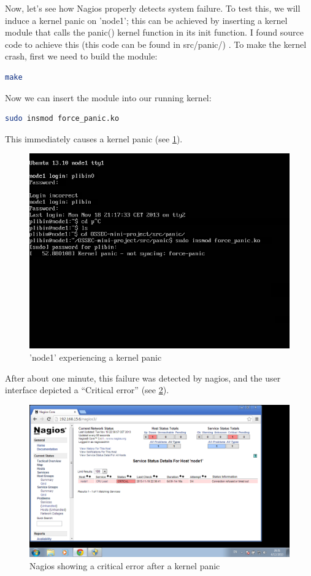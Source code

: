 \documentclass[12pt]{report}
\begin{document}
Now, let's see how Nagios properly detects system failure. To test
this, we will induce a kernel panic on 'node1'; this can be achieved
by inserting a kernel module that calls the panic() kernel function in
its init function. I found source code to achieve this (this code can
be found in src/panic/) \cite{simulate_linux_crash}.
To make the kernel crash, first we need to build the module:
\begin{lstlisting}[language=bash]
 make
\end{lstlisting} 
Now we can insert the module into our running kernel:
\begin{lstlisting}[language=bash]
 sudo insmod force_panic.ko
\end{lstlisting} 
This immediately causes a kernel panic (see \cref{fig:kernel_panic}).
\begin{figure}[h!]
  \caption{'node1' experiencing a kernel panic}
  \label{fig:kernel_panic}
  \centering
    \includegraphics[scale=0.4]{pics/kernel_panic.png}
\end{figure}
After about one minute, this failure was detected by nagios, and the
user interface depicted a ``Critical error'' (see \cref{fig:nagios_after_kernel_panic}).

\begin{figure}[h!]
  \caption{Nagios showing a critical error after a kernel panic}
  \label{fig:nagios_after_kernel_panic}
  \centering
    \includegraphics[scale=0.3]{pics/nagios_after_kernel_panic.png}
\end{figure}
\end{document}
